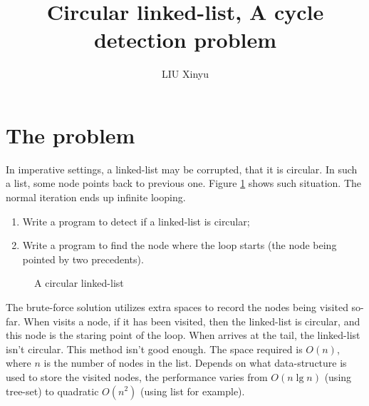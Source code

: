 \documentclass{article}
\begin{document}
\title{Circular linked-list, A cycle detection problem}
\author{LIU Xinyu}
\maketitle

\section{The problem}

In imperative settings, a linked-list may be corrupted, that it is circular. In such a list, some node
points back to previous one. Figure \ref{fig:circular-list} shows such situation.
The normal iteration ends up infinite looping.
  \begin{enumerate}
    \item Write a program to detect if a linked-list is circular;
    \item Write a program to find the node where the loop starts (the node being pointed by two precedents).
  \end{enumerate}

\begin{figure}[htbp]
\centering
{}
\caption{A circular linked-list}
\label{fig:circular-list}
\end{figure}

The brute-force solution utilizes extra spaces to record the nodes being visited so-far.
When visits a node, if it has been visited, then the linked-list is circular, and this
node is the staring point of the loop. When arrives at the tail, the linked-list isn't
circular. This method isn't good enough. The space required is $O(n)$, where $n$ is the
number of nodes in the list. Depends on what data-structure is used to store
the visited nodes, the performance varies from $O(n \lg n)$ (using tree-set) to quadratic $O(n^2)$
(using list for example).
\end{document}
